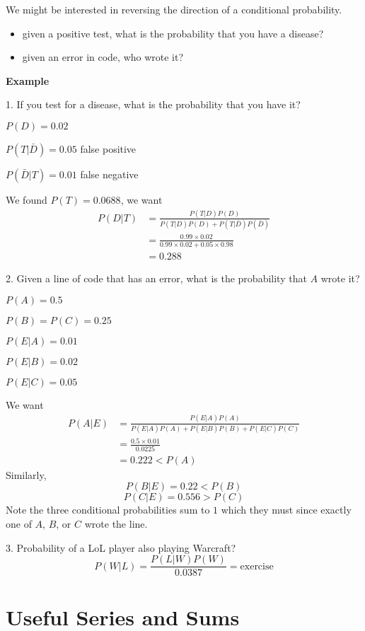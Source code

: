 We might be interested in reversing the direction of a conditional
probability.
\begin{itemize}
    \item given a positive test, what is the probability that you have a disease?
    \item given an error in code, who wrote it?
\end{itemize}

\textbf{Example}

1. If you test for a disease, what is the probability that you have it?

$ P(D)=0.02 $

$ P(T|\bar{D})=0.05 $ false positive

$ P(\bar{D}|T)=0.01 $ false negative

We found $ P(T)=0.0688 $, we want
\begin{align*}
    P(D|T) & =\frac{P(T|D)P(D)}{P(T|D)P(D)+P(T|\bar{D})P(\bar{D})}    \\
           & =\frac{0.99\times 0.02}{0.99\times 0.02+0.05\times 0.98} \\
           & =0.288
\end{align*}

2. Given a line of code that has an error, what is the probability that
$ A $ wrote it?

$ P(A)=0.5 $

$ P(B)=P(C)=0.25 $

$ P(E|A)=0.01 $

$ P(E|B)=0.02 $

$ P(E|C)=0.05 $

We want
\begin{align*}
    P(A|E) & =\frac{P(E|A)P(A)}{P(E|A)P(A)+P(E|B)P(B)+P(E|C)P(C)} \\
           & =\frac{0.5\times 0.01}{0.0225}                       \\
           & =0.222<P(A)
\end{align*}
Similarly,
\[ P(B|E)=0.22<P(B) \]
\[ P(C|E)=0.556>P(C) \]
Note the three conditional probabilities sum to $ 1 $ which they must since exactly
one of $ A $, $ B $, or $ C $ wrote the line.

3. Probability of a LoL player also playing Warcraft?
\[ P(W|L)=\frac{P(L|W)P(W)}{0.0387}=\text{exercise} \]

\section{Useful Series and Sums}

